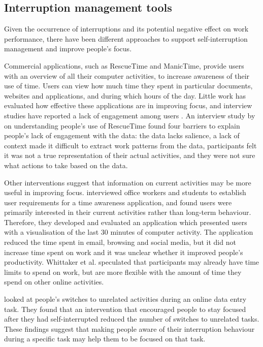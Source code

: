 \subsection{Interruption management tools}
Given the occurrence of interruptions and its potential negative effect on work performance, there have been different approaches to support self-interruption management and improve people's focus. 

Commercial applications, such as RescueTime and ManicTime, provide users with an overview of all their computer activities, to increase awareness of their use of time. Users can view how much time they spent in particular documents, websites and applications, and during which hours of the day. Little work has evaluated how effective these applications are in improving focus, and interview studies have reported a lack of engagement among users \citep{Collins2014, Whittaker2016}. An interview study by \citet{Collins2014} on understanding people’s use of RescueTime found four barriers to explain people’s lack of engagement with the data: the data lacks salience, a lack of context made it difficult to extract work patterns from the data, participants felt it was not a true representation of their actual activities, and they were not sure what actions to take based on the data. 

Other interventions suggest that information on current activities may be more useful in improving focus.
\citet{Whittaker2016} interviewed office workers and students to establish user requirements for a time awareness application, and found users were primarily interested in their current activities rather than long-term behaviour. Therefore, they developed and evaluated an application which presented users with a visualisation of the last 30 minutes of computer activity. The application reduced the time spent in email, browsing and social media, but it did not increase time spent on work and it was unclear whether it improved people’s productivity. Whittaker et al. speculated that participants may already have time limits to spend on work, but are more flexible with the amount of time they spend on other online activities.

\citet{Gould2016a} looked at people's switches to unrelated activities during an online data entry task. They found that an intervention that encouraged people to stay focused after they had self-interrupted reduced the number of switches to unrelated tasks. These findings suggest that making people aware of their interruption behaviour during a specific task may help them to be focused on that task.

